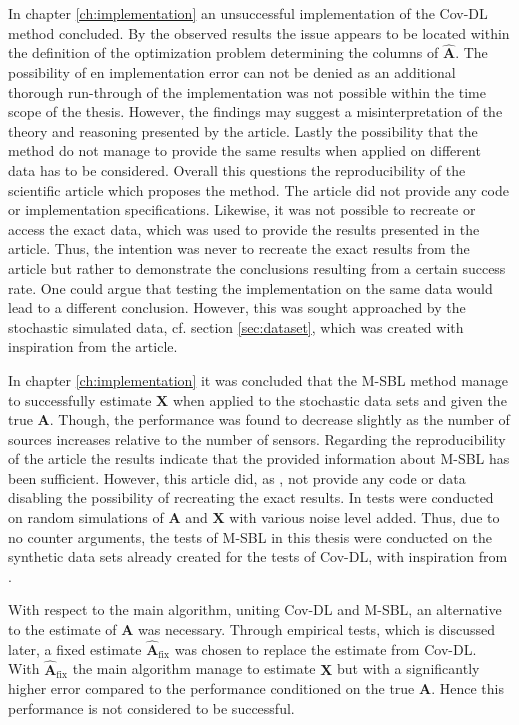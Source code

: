 In chapter \ref{ch:implementation} an unsuccessful implementation of the Cov-DL method concluded.
By the observed results the issue appears to be located within the definition of the optimization problem determining the columns of $\hat{\mathbf{A}}$. 
The possibility of en implementation error can not be denied as an additional thorough run-through of the implementation was not possible within the time scope of the thesis. 
However, the findings may suggest a misinterpretation of the theory and reasoning presented by the article. Lastly the possibility that the method do not manage to provide the same results when applied on different data has to be considered.       
Overall this questions the reproducibility of the scientific article \cite{Balkan2015} which proposes the method. 
The article did not provide any code or implementation specifications. 
Likewise, it was not possible to recreate or access the exact data, which was used to provide the results presented in the article. 
Thus, the intention was never to recreate the exact results from the article but rather to demonstrate the conclusions resulting from a certain success rate.  
One could argue that testing the implementation on the same data would lead to a different conclusion. 
However, this was sought approached by the stochastic simulated data, cf. section \ref{sec:dataset}, which was created with inspiration from the article.

In chapter \ref{ch:implementation} it was concluded that the M-SBL method manage to successfully estimate $\mathbf{X}$ when applied to the stochastic data sets and given the true $\mathbf{A}$. 
Though, the performance was found to decrease slightly as the number of sources increases relative to the number of sensors. 
Regarding the reproducibility of the article \cite{Balkan2014} the results indicate that the provided information about M-SBL has been sufficient.
However, this article did, as \cite{Balkan2015}, not provide any code or data disabling the possibility of recreating the exact results. In \cite{Balkan2014} tests were conducted on random simulations of $\mathbf{A}$ and $\mathbf{X}$ with various noise level added. 
Thus, due to no counter arguments, the tests of M-SBL in this thesis were conducted on the synthetic data sets already created for the tests of Cov-DL, with inspiration from \cite{Balkan2015}.

With respect to the main algorithm, uniting Cov-DL and M-SBL, an alternative to the estimate of $\mathbf{A}$ was necessary. 
Through empirical tests, which is discussed later, a fixed estimate $\hat{\mathbf{A}}_{\text{fix}}$ was chosen to replace the estimate from Cov-DL. 
With $\hat{\mathbf{A}}_{\text{fix}}$ the main algorithm manage to estimate $\mathbf{X}$ but with a significantly higher error compared to the performance conditioned on the true $\mathbf{A}$. Hence this performance is not considered to be successful.

